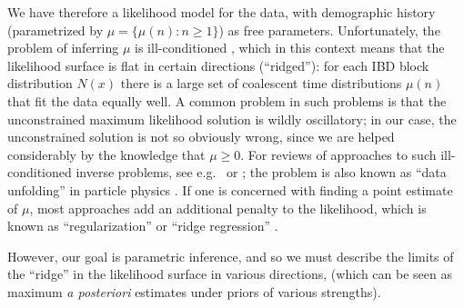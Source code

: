 \documentclass{article}
\begin{document}
We have therefore a likelihood model for the data,
with demographic history (parametrized by $\mu = \{\mu(n): n\ge1\}$) as free parameters.
Unfortunately, the problem of inferring $\mu$ is ill-conditioned \citep[unsuprising due to its similarity of the kernel \eqref{eqn:kernel_defn} to the Laplace transform, see][]{epstein2008badtruth},
which in this context means that the likelihood surface is flat in certain directions (``ridged''):
for each IBD block distribution $N(x)$
there is a large set of coalescent time distributions $\mu(n)$ that fit the data equally well.
A common problem in such problems is that the unconstrained maximum likelihood solution
is wildly oscillatory;
in our case, the unconstrained solution is not so obviously wrong,
since we are helped considerably by the knowledge that $\mu\ge0$.
For reviews of approaches to such ill-conditioned inverse problems, 
see e.g.\ \citet{petrov2005well} or \citet{stuart2010inverse};
the problem is also known as ``data unfolding'' in particle physics \citep{cowan1998statistical}.
If one is concerned with finding a point estimate of $\mu$,
most approaches add an additional penalty to the likelihood,
which is known as ``regularization'' \citep{tikhonov1977solutions} 
or ``ridge regression'' \citep{hoerl1970ridgeregression}.


However, our goal is parametric inference,
and so we must
describe the limits of the ``ridge'' in the likelihood surface in various directions,
(which can be seen as maximum {\it a posteriori} estimates under priors of various strengths).
\end{document}
